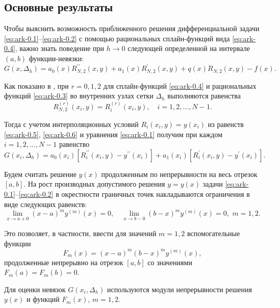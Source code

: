 \subsection{Основные результаты}

Чтобы выяснить возможность приближенного решения дифференциальной задачи 
\eqref{eq:ark-0.1}--\eqref{eq:ark-0.2} с помощью рациональных сплайн-функций вида \eqref{eq:ark-0.4}, 
важно знать поведение при $h\to 0$ следующей определенной на интервале $(a,b)$
функции-невязки:
\begin{equation}\label{eq:ark-0.5}
G(x, \Delta_h)=a_0(x)R_{N,2}^{\prime\prime}(x,y)+a_1(x)R_{N,2}^\prime(x,y)+
q(x)R_{N,2}(x,y)-f(x).
\end{equation}

Как показано в \cite{bib:ark-12}, при $r=0,1,2$ для сплайн-функций \eqref{eq:ark-0.4} и рациональных
функций \eqref{eq:ark-0.3} во внутренних узлах сетки $\Delta_h$ выполняются равенства
\begin{equation}\label{eq:ark-0.6}
R_{N,2}^{(r)}(x_i,y)=R_i^{(r)}(x_i,y),\quad i=1,2,\dots,N-1.
\end{equation}

Тогда с учетом интерполяционных условий $R_i(x_i,y)=y(x_i)$ из равенств \eqref{eq:ark-0.5},
\eqref{eq:ark-0.6} и уравнения \eqref{eq:ark-0.1} получим при каждом $i=1,2,\dots,N-1$ равенство
\begin{equation}\label{eq:ark-0.7}
G(x_i,\Delta_h)=a_0(x_i)[R_i^{\prime\prime}(x_i,y)-y^{\prime\prime}(x_i)]+
a_1(x_i)[R_i^\prime(x_i,y)-y^\prime(x_i)].
\end{equation}

Будем считать решение $y(x)$ продолженным по непрерывности на весь отрезок
$[a,b]$. На рост производных допустимого
решения $y=y(x)$ задачи \eqref{eq:ark-0.1}--\eqref{eq:ark-0.2} в окрестности граничных точек
накладываются ограничения в виде следующих равенств:
\begin{equation}\label{eq:ark-0.10}
\lim_{x\to a+0}(x-a)^m y^{(m)}(x)=0,\quad \lim_{x\to b-0}(b-x)^my^{(m)}(x)=0,
\,\, m=1,2.
\end{equation}

Это позволяет, в частности, ввести для значений $m=1,2$  вспомогательные функции
\begin{equation}\label{eq:ark-0.11}
F_m(x)=(x-a)^m(b-x)^m y^{(m)}(x),
\end{equation}
продолженные непрерывно на отрезок $[a,b]$ со значениями $F_m(a)=F_m(b)=0$.

Для оценки невязок $G(x_i, \Delta_h)$ используются модули непрерывности решения $y(x)$ 
и функций $F_m(x)$, $m=1,2$.

